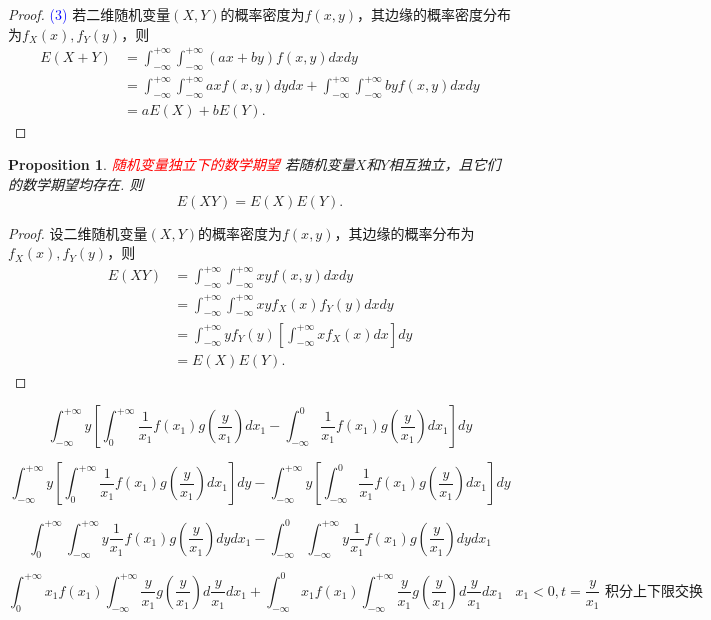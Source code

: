 \documentclass{article}
\newtheorem{proposition}[theorem]{Proposition}
\newcommand{\redt}[1]{\textcolor{red}{#1}}
\newcommand{\bluet}[1]{\textcolor{blue}{#1}}
\begin{document}
\begin{proof}
\bluet{(3)} 若二维随机变量$(X,Y)$的概率密度为$f(x,y)$，其边缘的概率密度分布为$f_X(x),f_Y(y)$，则
$$
\begin{array}{ll}
E(X+Y)&=\int_{-\infty}^{+\infty}\int_{-\infty}^{+\infty}(ax+by)f(x,y)dxdy \\
&= \int_{-\infty}^{+\infty}\int_{-\infty}^{+\infty}axf(x,y)dydx + \int_{-\infty}^{+\infty}\int_{-\infty}^{+\infty}byf(x,y)dxdy \\
&= aE(X) + bE(Y).
\end{array}
$$
\end{proof}

\begin{proposition}\label{expectation: independent}
\rm \redt{随机变量独立下的数学期望} 若随机变量$X$和$Y$相互独立，且它们的数学期望均存在. 则
$$
E(XY)=E(X)E(Y).
$$
\end{proposition}

\begin{proof}
\rm 设二维随机变量$(X,Y)$的概率密度为$f(x,y)$，其边缘的概率分布为$f_X(x),f_Y(y)$，则
$$
\begin{array}{ll}
E(XY) &= \int_{-\infty}^{+\infty}\int_{-\infty}^{+\infty} xyf(x,y)dxdy \\
&= \int_{-\infty}^{+\infty}\int_{-\infty}^{+\infty} xyf_X(x)f_Y(y)dxdy \\
&= \int_{-\infty}^{+\infty}yf_Y(y)\left[\int_{-\infty}^{+\infty}xf_X(x)dx\right]dy\\
&=E(X)E(Y).
\end{array}
$$
\end{proof}


$$
\int_{-\infty}^{+\infty}y \left[\int_0^{+\infty} \frac{1}{x_1}f(x_1)g(\frac{y}{x_1})dx_1 - \int_{-\infty}^0 \frac{1}{x_1}f(x_1)g(\frac{y}{x_1})dx_1 \right]dy
$$

$$
\int_{-\infty}^{+\infty}y \left[\int_0^{+\infty} \frac{1}{x_1}f(x_1)g(\frac{y}{x_1})dx_1\right]dy - \int_{-\infty}^{+\infty}y\left[\int_{-\infty}^0 \frac{1}{x_1}f(x_1)g(\frac{y}{x_1})dx_1 \right]dy
$$

$$
\int_0^{+\infty}\int_{-\infty}^{+\infty} y\frac{1}{x_1}f(x_1)g(\frac{y}{x_1})dydx_1 - \int_{-\infty}^0\int_{-\infty}^{+\infty} y\frac{1}{x_1}f(x_1)g(\frac{y}{x_1})dydx_1
$$

$$
\int_0^{+\infty}x_1f(x_1)\int_{-\infty}^{+\infty}\frac{y}{x_1}g(\frac{y}{x_1})d\frac{y}{x_1}dx_1 + \int_{-\infty}^0x_1f(x_1)\int_{-\infty}^{+\infty} \frac{y}{x_1}g(\frac{y}{x_1})d\frac{y}{x_1}dx_1 ~~~~ \text{$x_1 < 0, t=\frac{y}{x_1}$ 积分上下限交换}
$$
\end{document}
